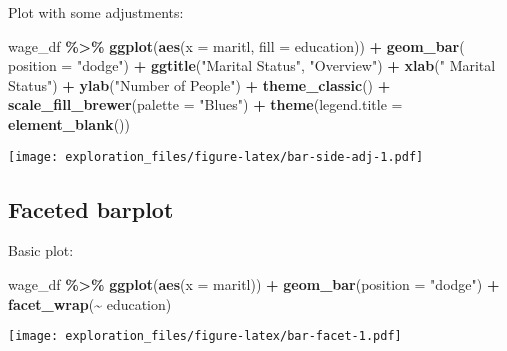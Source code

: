 \documentclass[
]{book}
\newenvironment{Shaded}{\begin{snugshade}}{\end{snugshade}}
\newcommand{\DataTypeTok}[1]{\textcolor[rgb]{0.13,0.29,0.53}{#1}}
\newcommand{\KeywordTok}[1]{\textcolor[rgb]{0.13,0.29,0.53}{\textbf{#1}}}
\newcommand{\NormalTok}[1]{#1}
\newcommand{\OperatorTok}[1]{\textcolor[rgb]{0.81,0.36,0.00}{\textbf{#1}}}
\newcommand{\StringTok}[1]{\textcolor[rgb]{0.31,0.60,0.02}{#1}}
\begin{document}
Plot with some adjustments:

\begin{Shaded}
\begin{Highlighting}[]
\NormalTok{wage\_df }\OperatorTok{\%\textgreater{}\%}\StringTok{ }
\StringTok{  }\KeywordTok{ggplot}\NormalTok{(}\KeywordTok{aes}\NormalTok{(}\DataTypeTok{x =}\NormalTok{ maritl, }\DataTypeTok{fill =}\NormalTok{ education)) }\OperatorTok{+}
\StringTok{  }\KeywordTok{geom\_bar}\NormalTok{( }\DataTypeTok{position =} \StringTok{"dodge"}\NormalTok{) }\OperatorTok{+}
\StringTok{  }\KeywordTok{ggtitle}\NormalTok{(}\StringTok{"Marital Status"}\NormalTok{, }\StringTok{"Overview"}\NormalTok{) }\OperatorTok{+}
\StringTok{  }\KeywordTok{xlab}\NormalTok{(}\StringTok{" Marital Status"}\NormalTok{) }\OperatorTok{+}
\StringTok{  }\KeywordTok{ylab}\NormalTok{(}\StringTok{"Number of People"}\NormalTok{) }\OperatorTok{+}
\StringTok{  }\KeywordTok{theme\_classic}\NormalTok{() }\OperatorTok{+}
\StringTok{  }\KeywordTok{scale\_fill\_brewer}\NormalTok{(}\DataTypeTok{palette =} \StringTok{"Blues"}\NormalTok{) }\OperatorTok{+}
\StringTok{  }\KeywordTok{theme}\NormalTok{(}\DataTypeTok{legend.title =} \KeywordTok{element\_blank}\NormalTok{())}
\end{Highlighting}
\end{Shaded}

\texttt{[image: exploration\_files/figure-latex/bar-side-adj-1.pdf]}

\hypertarget{faceted-barplot}{%
\subsection{Faceted barplot}\label{faceted-barplot}}

Basic plot:

\begin{Shaded}
\begin{Highlighting}[]
\NormalTok{wage\_df }\OperatorTok{\%\textgreater{}\%}\StringTok{ }
\StringTok{  }\KeywordTok{ggplot}\NormalTok{(}\KeywordTok{aes}\NormalTok{(}\DataTypeTok{x =}\NormalTok{ maritl)) }\OperatorTok{+}
\StringTok{  }\KeywordTok{geom\_bar}\NormalTok{(}\DataTypeTok{position =} \StringTok{"dodge"}\NormalTok{) }\OperatorTok{+}
\StringTok{  }\KeywordTok{facet\_wrap}\NormalTok{(}\OperatorTok{\textasciitilde{}}\StringTok{ }\NormalTok{education)}
\end{Highlighting}
\end{Shaded}

\texttt{[image: exploration\_files/figure-latex/bar-facet-1.pdf]}
\end{document}
